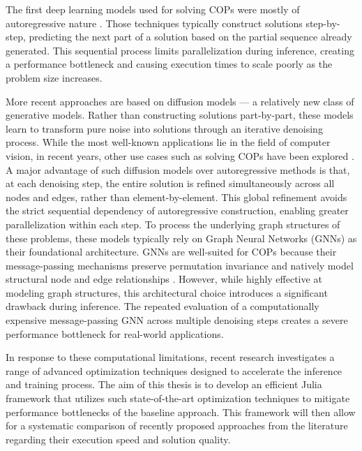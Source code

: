 \documentclass[11pt,a4paper]{article}
\begin{document}
The first deep learning models used for solving COPs were mostly of autoregressive nature \cite{bello-16-NCO-with-RL, kool-18-tsp-attention, vinyal-15-pointer-networks}. Those techniques typically construct solutions step-by-step, predicting the next part of a solution based on the partial sequence already generated. This sequential process limits parallelization during inference, creating a performance bottleneck and causing execution times to scale poorly as the problem size increases.

More recent approaches are based on diffusion models --- a relatively new class of generative models. Rather than constructing solutions part-by-part, these models learn to transform pure noise into solutions through an iterative denoising process. While the most well-known applications lie in the field of computer vision, in recent years, other use cases such as solving COPs have been explored \cite{yang-23-diffusion-applications}. A major advantage of such diffusion models over autoregressive methods is that, at each denoising step, the entire solution is refined simultaneously across all nodes and edges, rather than element-by-element. This global refinement avoids the strict sequential dependency of autoregressive construction, enabling greater parallelization within each step. To process the underlying graph structures of these problems, these models typically rely on Graph Neural Networks (GNNs) as their foundational architecture. GNNs are well-suited for COPs because their message-passing mechanisms preserve permutation invariance and natively model structural node and edge relationships \cite{cappart-21-gnns}. However, while highly effective at modeling graph structures, this architectural choice introduces a significant drawback during inference. The repeated evaluation of a computationally expensive message-passing GNN across multiple denoising steps creates a severe performance bottleneck for real-world applications.

In response to these computational limitations, recent research investigates a range of advanced optimization techniques designed to accelerate the inference and training process.
The aim of this thesis is to develop an efficient Julia framework that utilizes such state-of-the-art optimization techniques to mitigate performance bottlenecks of the baseline approach. This framework will then allow for a systematic comparison of recently proposed approaches from the literature regarding their execution speed and solution quality.
\end{document}
